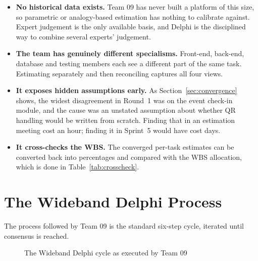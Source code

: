 \documentclass[11pt,a4paper]{report}
\begin{document}
\begin{itemize}
  \item \textbf{No historical data exists.} Team 09 has never built a platform of
  this size, so parametric or analogy-based estimation has nothing to calibrate
  against. Expert judgement is the only available basis, and Delphi is the
  disciplined way to combine several experts' judgement.
  \item \textbf{The team has genuinely different specialisms.} Front-end,
  back-end, database and testing members each see a different part of the same
  task. Estimating separately and then reconciling captures all four views.
  \item \textbf{It exposes hidden assumptions early.} As
  Section~\ref{sec:convergence} shows, the widest disagreement in Round~1 was on
  the event check-in module, and the cause was an unstated assumption about
  whether QR handling would be written from scratch. Finding that in an
  estimation meeting cost an hour; finding it in Sprint~5 would have cost days.
  \item \textbf{It cross-checks the WBS.} The converged per-task estimates can be
  converted back into percentages and compared with the WBS allocation, which is
  done in Table~\ref{tab:crosscheck}.
\end{itemize}

\section{The Wideband Delphi Process}

The process followed by Team 09 is the standard six-step cycle, iterated until
consensus is reached.

\begin{figure}[htbp]
\centering
{}
\caption{The Wideband Delphi cycle as executed by Team 09}
\label{fig:delphiflow}
\end{figure}
\end{document}
